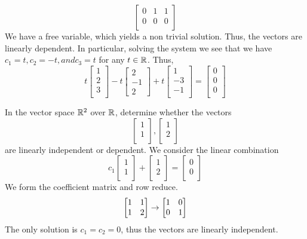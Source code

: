 \documentclass{article}
\begin{document}
\begin{example}
\[\begin{bmatrix}
      0 & 1 & 1\\
      0 & 0 & 0\\
    \end{bmatrix}
  \]
  We have a free variable, which yields a non trivial solution. Thus, the vectors are linearly dependent. In particular, solving the system we see that we have $c_1 = t, c_2 = -t, and c_3 = t$ for any $t \in \mathbb{R}$. Thus,
  \[
    t
    \begin{bmatrix}
      1\\2\\3\\
    \end{bmatrix} -t
    \begin{bmatrix}
      2\\-1\\2
    \end{bmatrix} + t
    \begin{bmatrix}
      1\\-3\\-1\\
    \end{bmatrix}
    =
    \begin{bmatrix}
      0\\0\\0\\
    \end{bmatrix}
  \]
\end{example}
\begin{example}
  In the vector space $\mathbb{R}^2$ over $\mathbb{R}$, determine whether the vectors \[
    \begin{bmatrix}
      1\\1\\
    \end{bmatrix},
    \begin{bmatrix}
      1\\2\\
    \end{bmatrix}
  \]
  are linearly independent or dependent.
  We consider the linear combination
  \[
    c_1
    \begin{bmatrix}
      1\\1\\
    \end{bmatrix} +
    \begin{bmatrix}
      1\\2\\
    \end{bmatrix} =
    \begin{bmatrix}
      0\\0\\
    \end{bmatrix}
  \]
  We form the coefficient matrix and row reduce. \[
    \begin{bmatrix}
      1 & 1\\
      1 & 2\\
    \end{bmatrix} \to
    \begin{bmatrix}
      \imat{2}
    \end{bmatrix}
  \]
  The only solution is $c_1 = c_2 = 0$, thus the vectors are linearly independent.
\end{example}
\end{document}
